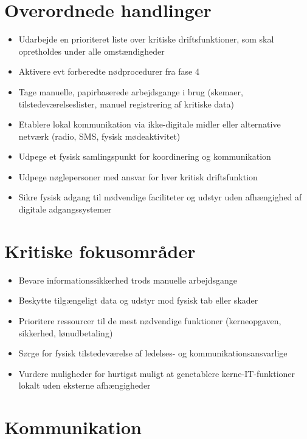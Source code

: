 \documentclass[a4paper,11pt]{book}
\begin{document}
\section{Overordnede handlinger}\label{overordnede-handlinger}

\begin{itemize}
\tightlist
\item
  Udarbejde en prioriteret liste over kritiske driftsfunktioner, som
  skal opretholdes under alle omstændigheder
\item
  Aktivere evt forberedte nødprocedurer fra fase 4
\item
  Tage manuelle, papirbaserede arbejdsgange i brug (skemaer,
  tilstedeværelseslister, manuel registrering af kritiske data)
\item
  Etablere lokal kommunikation via ikke-digitale midler eller
  alternative netværk (radio, SMS, fysisk mødeaktivitet)
\item
  Udpege et fysisk samlingspunkt for koordinering og kommunikation
\item
  Udpege nøglepersoner med ansvar for hver kritisk driftsfunktion
\item
  Sikre fysisk adgang til nødvendige faciliteter og udstyr uden
  afhængighed af digitale adgangssystemer
\end{itemize}

\section{Kritiske fokusområder}\label{kritiske-fokusomruxe5der}

\begin{itemize}
\tightlist
\item
  Bevare informationssikkerhed trods manuelle arbejdsgange
\item
  Beskytte tilgængeligt data og udstyr mod fysisk tab eller skader
\item
  Prioritere ressourcer til de mest nødvendige funktioner (kerneopgaven,
  sikkerhed, lønudbetaling)
\item
  Sørge for fysisk tilstedeværelse af ledelses- og
  kommunikationsansvarlige
\item
  Vurdere muligheder for hurtigst muligt at genetablere
  kerne-IT-funktioner lokalt uden eksterne afhængigheder
\end{itemize}

\section{Kommunikation}\label{kommunikation}
\end{document}
